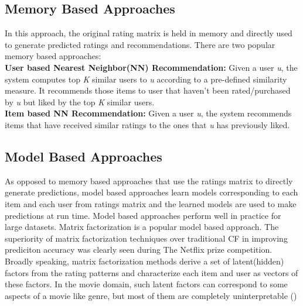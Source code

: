 \subsection {Memory Based Approaches}
In this approach, the original rating matrix is held in memory and directly used to generate predicted ratings and recommendations. There are two popular memory based approaches:\\
\textbf{User based Nearest Neighbor(NN) Recommendation:} Given a user \textit{u}, the system computes top \textit{K} similar users to \textit{u} according to a pre-defined similarity measure. It recommends those items to user that haven't been rated/purchased by \textit{u} but liked by the top \textit{K} similar users.\\
\textbf{Item based NN Recommendation:} Given a user \textit{u}, the system recommends items that have received similar ratings to the ones that \textit{u} has previously liked.
 


\subsection {Model Based Approaches}
As opposed to memory based approaches that use the ratings matrix to directly generate predictions, model based approaches learn models corresponding to each item and each user from ratings matrix and the learned models are used to make predictions at run time.
Model based approaches perform well in practice for large datasets.
Matrix factorization is a popular model based approach. The superiority of matrix factorization techniques over traditional CF in improving prediciton accuracy was clearly seen during The Netflix prize competition.
Broadly speaking, matrix factorization methods derive a set of latent(hidden) factors from the rating patterns and characterize each item and user as vectors of these factors.
In the movie domain, such latent factors can correspond to some aspects of a movie like genre, but most of them are completely uninterpretable (\cite{koren})


